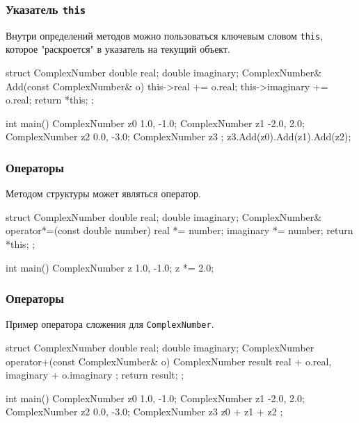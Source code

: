 \documentclass[compress, 8pt]{beamer}
\begin{document}
\begin{frame}[fragile]

    \frametitle{Указатель \texttt{this}}

    \hfill\break
    Внутри определений методов можно пользоваться ключевым словом
    \verb|this|\footnotemark{},
    которое "раскроется" в указатель на текущий объект.


    \begin{myinplacelisting}[minted language=cpp]
struct ComplexNumber {
    double real;
    double imaginary;
    ComplexNumber& Add(const ComplexNumber& o) {
        this->real += o.real;
        this->imaginary += o.real;
        return *this;
    }
};

int main() {
    ComplexNumber z0 {1.0, -1.0};
    ComplexNumber z1 {-2.0, 2.0};
    ComplexNumber z2 {0.0, -3.0};
    ComplexNumber z3 {};
    z3.Add(z0).Add(z1).Add(z2);
}
    \end{myinplacelisting}

\end{frame}

\begin{frame}[fragile]

    \frametitle{Операторы}

    Методом структуры может являться оператор.

    \begin{myinplacelisting}[minted language=cpp]
struct ComplexNumber {
    double real;
    double imaginary;
    ComplexNumber& operator*=(const double number) {
        real *= number;
        imaginary *= number;
        return *this;
    }
};

int main() {
    ComplexNumber z {1.0, -1.0};
    z *= 2.0;
}
    \end{myinplacelisting}

\end{frame}

\begin{frame}[fragile]

    \frametitle{Операторы}

    Пример оператора сложения для \verb|ComplexNumber|.

    \begin{myinplacelisting}[minted language=cpp]
struct ComplexNumber {
    double real;
    double imaginary;
    ComplexNumber operator+(const ComplexNumber& o) {
        ComplexNumber result {
            real + o.real,
            imaginary + o.imaginary
        };
        return result;
    }
};

int main() {
    ComplexNumber z0 {1.0, -1.0};
    ComplexNumber z1 {-2.0, 2.0};
    ComplexNumber z2 {0.0, -3.0};
    ComplexNumber z3 { z0 + z1 + z2 };
}
    \end{myinplacelisting}

\end{frame}
\end{document}
